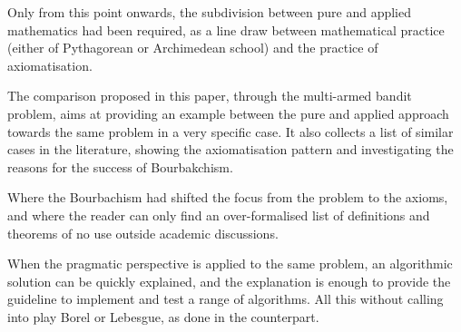 \documentclass[]{scrartcl}
\theoremstyle{definition}
\begin{document}
Only from this point onwards, the subdivision between pure and applied mathematics had been required, as a line draw between mathematical practice (either of Pythagorean or Archimedean school) and the practice of axiomatisation.

The comparison proposed in this paper, through the multi-armed bandit problem, aims at providing an example between the pure and applied approach towards the same problem in a very specific case. It also collects a list of similar cases in the literature, showing the axiomatisation pattern and investigating the reasons for the success of Bourbakchism.

Where the Bourbachism had shifted the focus from the problem to the axioms, and where the reader can only find an over-formalised list of definitions and theorems of no use outside academic discussions.

When the pragmatic perspective is applied to the same problem, an algorithmic solution can be quickly explained, and the explanation is enough to provide the guideline to implement and test a range of algorithms. All this without calling into play Borel or Lebesgue, as done in the counterpart.

%
%
%
%
%




\end{document}
